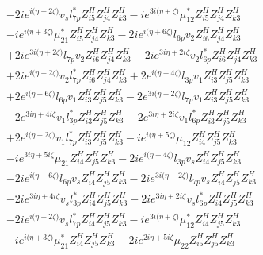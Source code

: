 \begin{align}
 &-2 i e^{i \Big(\eta +2 \zeta \Big)} v_s l_{7p}^* Z_{{i 5}}^{H} Z_{{j 4}}^{H} Z_{{k 3}}^{H} -i e^{3 i \Big(\eta +\zeta \Big)} \mu_{12}^* Z_{{i 5}}^{H} Z_{{j 4}}^{H} Z_{{k 3}}^{H} \nonumber \\ 
 &-i e^{i \Big(\eta +3 \zeta \Big)} \mu_{21}^* Z_{{i 5}}^{H} Z_{{j 4}}^{H} Z_{{k 3}}^{H} -2 i e^{i \Big(\eta +6 \zeta \Big)} l_{6p} v_2 Z_{{i 6}}^{H} Z_{{j 4}}^{H} Z_{{k 3}}^{H} \nonumber \\ 
 &+2 i e^{3 i \Big(\eta +2 \zeta \Big)} l_{7p} v_2 Z_{{i 6}}^{H} Z_{{j 4}}^{H} Z_{{k 3}}^{H} -2 i e^{3 i \eta +2 i \zeta } v_2 l_{6p}^* Z_{{i 6}}^{H} Z_{{j 4}}^{H} Z_{{k 3}}^{H} \nonumber \\ 
 &+2 i e^{i \Big(\eta +2 \zeta \Big)} v_2 l_{7p}^* Z_{{i 6}}^{H} Z_{{j 4}}^{H} Z_{{k 3}}^{H} +2 e^{i \Big(\eta +4 \zeta \Big)} l_{3p} v_1 Z_{{i 3}}^{H} Z_{{j 5}}^{H} Z_{{k 3}}^{H} \nonumber \\ 
 &+2 e^{i \Big(\eta +6 \zeta \Big)} l_{6p} v_1 Z_{{i 3}}^{H} Z_{{j 5}}^{H} Z_{{k 3}}^{H} -2 e^{3 i \Big(\eta +2 \zeta \Big)} l_{7p} v_1 Z_{{i 3}}^{H} Z_{{j 5}}^{H} Z_{{k 3}}^{H} \nonumber \\ 
 &-2 e^{3 i \eta +4 i \zeta } v_1 l_{3p}^* Z_{{i 3}}^{H} Z_{{j 5}}^{H} Z_{{k 3}}^{H} -2 e^{3 i \eta +2 i \zeta } v_1 l_{6p}^* Z_{{i 3}}^{H} Z_{{j 5}}^{H} Z_{{k 3}}^{H} \nonumber \\ 
 &+2 e^{i \Big(\eta +2 \zeta \Big)} v_1 l_{7p}^* Z_{{i 3}}^{H} Z_{{j 5}}^{H} Z_{{k 3}}^{H} -i e^{i \Big(\eta +5 \zeta \Big)} \mu_{12} Z_{{i 4}}^{H} Z_{{j 5}}^{H} Z_{{k 3}}^{H} \nonumber \\ 
 &-i e^{3 i \eta +5 i \zeta } \mu_{21} Z_{{i 4}}^{H} Z_{{j 5}}^{H} Z_{{k 3}}^{H} -2 i e^{i \Big(\eta +4 \zeta \Big)} l_{3p} v_s Z_{{i 4}}^{H} Z_{{j 5}}^{H} Z_{{k 3}}^{H} \nonumber \\ 
 &-2 i e^{i \Big(\eta +6 \zeta \Big)} l_{6p} v_s Z_{{i 4}}^{H} Z_{{j 5}}^{H} Z_{{k 3}}^{H} -2 i e^{3 i \Big(\eta +2 \zeta \Big)} l_{7p} v_s Z_{{i 4}}^{H} Z_{{j 5}}^{H} Z_{{k 3}}^{H} \nonumber \\ 
 &-2 i e^{3 i \eta +4 i \zeta } v_s l_{3p}^* Z_{{i 4}}^{H} Z_{{j 5}}^{H} Z_{{k 3}}^{H} -2 i e^{3 i \eta +2 i \zeta } v_s l_{6p}^* Z_{{i 4}}^{H} Z_{{j 5}}^{H} Z_{{k 3}}^{H} \nonumber \\ 
 &-2 i e^{i \Big(\eta +2 \zeta \Big)} v_s l_{7p}^* Z_{{i 4}}^{H} Z_{{j 5}}^{H} Z_{{k 3}}^{H} -i e^{3 i \Big(\eta +\zeta \Big)} \mu_{12}^* Z_{{i 4}}^{H} Z_{{j 5}}^{H} Z_{{k 3}}^{H} \nonumber \\ 
 &-i e^{i \Big(\eta +3 \zeta \Big)} \mu_{21}^* Z_{{i 4}}^{H} Z_{{j 5}}^{H} Z_{{k 3}}^{H} -2 i e^{2 i \eta +5 i \zeta } \mu_{22} Z_{{i 5}}^{H} Z_{{j 5}}^{H} Z_{{k 3}}^{H} \nonumber \\ 

\end{align}
